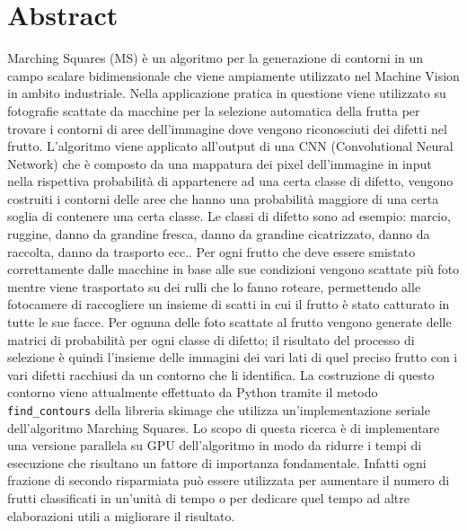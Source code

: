 \documentclass[12pt,a4paper]{report}
\begin{document}
\chapter*{Abstract}
Marching Squares (MS) è un algoritmo per la generazione di contorni in un campo scalare bidimensionale che viene ampiamente utilizzato nel Machine Vision in ambito industriale. Nella applicazione pratica in questione viene utilizzato su fotografie scattate da macchine per la selezione automatica della frutta per trovare i contorni di aree dell'immagine dove vengono riconosciuti dei difetti nel frutto. L'algoritmo viene applicato all'output di una CNN (Convolutional Neural Network) che è composto da una mappatura dei pixel dell'immagine in input nella rispettiva probabilità di appartenere ad una certa classe di difetto, vengono costruiti i contorni delle aree che hanno una probabilità maggiore di una certa soglia di contenere una certa classe. Le classi di difetto sono ad esempio: marcio, ruggine, danno da grandine fresca, danno da grandine cicatrizzato, danno da raccolta, danno da trasporto ecc.. \newline
Per ogni frutto che deve essere smistato correttamente dalle macchine in base alle sue condizioni vengono scattate più foto mentre viene trasportato su dei rulli che lo fanno roteare, permettendo alle fotocamere di raccogliere un insieme di scatti in cui il frutto è stato catturato in tutte le sue facce. Per ognuna delle foto scattate al frutto vengono generate delle matrici di probabilità per ogni classe di difetto; il risultato del processo di selezione è quindi l'insieme delle immagini dei vari lati di quel preciso frutto con i vari difetti racchiusi da un contorno che li identifica. \newline 
La costruzione di questo contorno viene attualmente effettuato da Python tramite il metodo \verb|find_contours| della libreria skimage che utilizza un'implementazione seriale dell'algoritmo Marching Squares. Lo scopo di questa ricerca è di implementare una versione parallela su GPU dell'algoritmo in modo da ridurre i tempi di esecuzione che risultano un fattore di importanza fondamentale.  Infatti ogni frazione di secondo risparmiata può essere utilizzata per aumentare il numero di frutti classificati in un'unità di tempo o per dedicare quel tempo ad altre elaborazioni utili a migliorare il risultato. 
\end{document}
